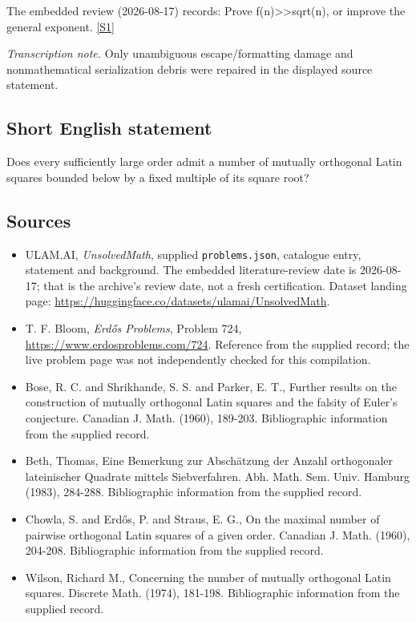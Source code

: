 \documentclass[11pt,a4paper]{article}
\newcommand{\sref}[2]{\hyperlink{source:#1:#2}{[S#2]}}
\begin{document}
The embedded review (2026-08-17) records: Prove f(n)>>sqrt(n), or improve the general exponent. \sref{statement}{1}

{\small\emph{Transcription note.} Only unambiguous escape/formatting damage and nonmathematical serialization debris were repaired in the displayed source statement.}

\subsection{Short English statement}

Does every sufficiently large order admit a number of mutually orthogonal Latin squares bounded below by a fixed multiple of its square root?

\subsection{Sources}

{\small

\begin{itemize}

\item[\hypertarget{source:statement:1}{S1}] ULAM.AI, \emph{UnsolvedMath}, supplied \texttt{problems.json}, catalogue entry, statement and background. The embedded literature-review date is 2026-08-17; that is the archive’s review date, not a fresh certification. Dataset landing page: \url{https://huggingface.co/datasets/ulamai/UnsolvedMath}.

\item[\hypertarget{source:statement:2}{S2}] T. F. Bloom, \emph{Erdős Problems}, Problem 724, \url{https://www.erdosproblems.com/724}. Reference from the supplied record; the live problem page was not independently checked for this compilation.

\item[\hypertarget{source:statement:3}{S3}] Bose, R. C. and Shrikhande, S. S. and Parker, E. T., Further results on the construction of mutually orthogonal Latin squares and the falsity of Euler's conjecture. Canadian J. Math. (1960), 189-203. Bibliographic information from the supplied record.

\item[\hypertarget{source:statement:4}{S4}] Beth, Thomas, Eine Bemerkung zur Absch\"{a}tzung der Anzahl orthogonaler lateinischer Quadrate mittels Siebverfahren. Abh. Math. Sem. Univ. Hamburg (1983), 284-288. Bibliographic information from the supplied record.

\item[\hypertarget{source:statement:5}{S5}] Chowla, S. and Erd\H{o}s, P. and Straus, E. G., On the maximal number of pairwise orthogonal Latin squares of a given order. Canadian J. Math. (1960), 204-208. Bibliographic information from the supplied record.

\item[\hypertarget{source:statement:6}{S6}] Wilson, Richard M., Concerning the number of mutually orthogonal Latin squares. Discrete Math. (1974), 181-198. Bibliographic information from the supplied record.

\end{itemize}

}

\label{end:statement}
\end{document}
